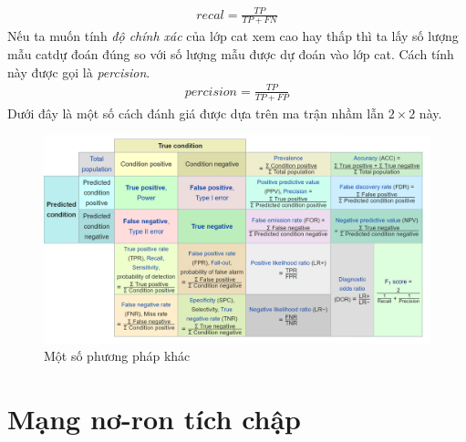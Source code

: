 \begin{align}
\textit{recal} = \frac{TP}{TP + FN}
\end{align}
Nếu ta muốn tính \textit{độ chính xác} của lớp cat xem cao hay thấp thì ta lấy số lượng mẫu catdự đoán đúng so với số lượng mẫu được dự đoán vào lớp cat. Cách tính này được gọi là \textit{ percision}.
\begin{align}
\textit{percision} = \frac{TP}{TP + FP}
\end{align} 
Dưới đây là một số cách đánh giá được dựa trên ma trận nhầm lẫn $2\times 2$ này.
\begin{figure}[H]
\begin{center}
\includegraphics[scale=0.5]{chap3/image/confusionmatrix7.png}
\end{center}
\caption{Một số phương pháp khác}
\end{figure}
\section{Mạng nơ-ron tích chập}
